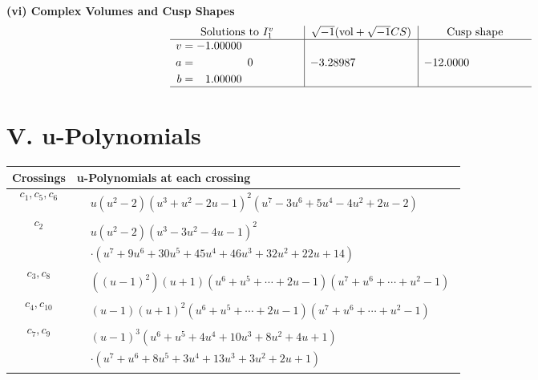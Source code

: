 \documentclass[1p]{elsarticle_modified}
\theoremstyle{definition}
\newcommand{\I}{\sqrt{-1}}
\begin{document}
\newpage\flushleft \textbf{(vi) Complex Volumes and Cusp Shapes}
$$\begin{array}{c|c|c}  
\text{Solutions to }I^v_{1}& \I (\text{vol} + \sqrt{-1}CS) & \text{Cusp shape}\\
 \hline 
\begin{aligned}
v &= -1.00000\phantom{ +0.000000I} \\
a &= \phantom{-0.000000 } 0 \\
b &= \phantom{-}1.00000\phantom{ +0.000000I}\end{aligned}
 & -3.28987\phantom{ +0.000000I} & -12.0000\phantom{ +0.000000I}\\
 \hline 
 \end{array}$$\newpage
\newpage\renewcommand{\arraystretch}{1}
\centering \section*{ V. u-Polynomials}
\begin{tabular}{m{50pt}|m{274pt}}
Crossings & \hspace{64pt}u-Polynomials at each crossing \\
\hline $$\begin{aligned}c_{1},c_{5},c_{6}\end{aligned}$$&$\begin{aligned}
&u(u^2-2)(u^3+u^2-2 u-1)^2(u^7-3 u^6+5 u^4-4 u^2+2 u-2)
\end{aligned}$\\
\hline $$\begin{aligned}c_{2}\end{aligned}$$&$\begin{aligned}
&u(u^2-2)(u^3-3 u^2-4 u-1)^2\\
&\cdot(u^7+9 u^6+30 u^5+45 u^4+46 u^3+32 u^2+22 u+14)
\end{aligned}$\\
\hline $$\begin{aligned}c_{3},c_{8}\end{aligned}$$&$\begin{aligned}
&((u-1)^2)(u+1)(u^6+u^5+\cdots+2 u-1)(u^7+u^6+\cdots+u^2-1)
\end{aligned}$\\
\hline $$\begin{aligned}c_{4},c_{10}\end{aligned}$$&$\begin{aligned}
&(u-1)(u+1)^2(u^6+u^5+\cdots+2 u-1)(u^7+u^6+\cdots+u^2-1)
\end{aligned}$\\
\hline $$\begin{aligned}c_{7},c_{9}\end{aligned}$$&$\begin{aligned}
&(u-1)^3(u^6+u^5+4 u^4+10 u^3+8 u^2+4 u+1)\\
&\cdot(u^7+u^6+8 u^5+3 u^4+13 u^3+3 u^2+2 u+1)
\end{aligned}$\\
\hline
\end{tabular}\newpage\renewcommand{\arraystretch}{1}
\end{document}
